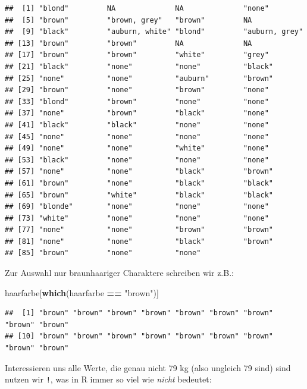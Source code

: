 \documentclass[
]{book}
\newenvironment{Shaded}{\begin{snugshade}}{\end{snugshade}}
\newcommand{\FunctionTok}[1]{\textcolor[rgb]{0.13,0.29,0.53}{\textbf{#1}}}
\newcommand{\NormalTok}[1]{#1}
\newcommand{\SpecialCharTok}[1]{\textcolor[rgb]{0.81,0.36,0.00}{\textbf{#1}}}
\newcommand{\StringTok}[1]{\textcolor[rgb]{0.31,0.60,0.02}{#1}}
\newcounter{none} %
\begin{document}
\begin{verbatim}
##  [1] "blond"         NA              NA              "none"         
##  [5] "brown"         "brown, grey"   "brown"         NA             
##  [9] "black"         "auburn, white" "blond"         "auburn, grey" 
## [13] "brown"         "brown"         NA              NA             
## [17] "brown"         "brown"         "white"         "grey"         
## [21] "black"         "none"          "none"          "black"        
## [25] "none"          "none"          "auburn"        "brown"        
## [29] "brown"         "none"          "brown"         "none"         
## [33] "blond"         "brown"         "none"          "none"         
## [37] "none"          "brown"         "black"         "none"         
## [41] "black"         "black"         "none"          "none"         
## [45] "none"          "none"          "none"          "none"         
## [49] "none"          "none"          "white"         "none"         
## [53] "black"         "none"          "none"          "none"         
## [57] "none"          "none"          "black"         "brown"        
## [61] "brown"         "none"          "black"         "black"        
## [65] "brown"         "white"         "black"         "black"        
## [69] "blonde"        "none"          "none"          "none"         
## [73] "white"         "none"          "none"          "none"         
## [77] "none"          "none"          "brown"         "brown"        
## [81] "none"          "none"          "black"         "brown"        
## [85] "brown"         "none"          "none"
\end{verbatim}

Zur Auswahl nur braunhaariger Charaktere schreiben wir z.B.:

\begin{Shaded}
\begin{Highlighting}[]
\NormalTok{haarfarbe[}\FunctionTok{which}\NormalTok{(haarfarbe }\SpecialCharTok{==} \StringTok{"brown"}\NormalTok{)]}
\end{Highlighting}
\end{Shaded}

\begin{verbatim}
##  [1] "brown" "brown" "brown" "brown" "brown" "brown" "brown" "brown" "brown"
## [10] "brown" "brown" "brown" "brown" "brown" "brown" "brown" "brown" "brown"
\end{verbatim}

Interessieren uns alle Werte, die genau nicht 79 kg (also ungleich 79 sind) sind nutzen wir \texttt{!}, was in R immer so viel wie \emph{nicht} bedeutet:
\end{document}
